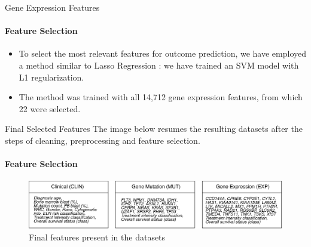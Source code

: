 
    
    


\begin{frame}{Gene Expression Features}
\framesubtitle{Feature Selection}

\begin{itemize}
    \item To select the most relevant features for outcome prediction, we have employed a method similar to Lasso Regression \cite{Tibshirani-1996}: we have trained an SVM model with L1 regularization.
    \item The method was trained with all 14,712 gene expression features, from which 22 were selected.
    
    
\end{itemize}
    
\end{frame}


\begin{frame}{Final Selected Features}
The image below resumes the resulting datasets after the steps of cleaning, preprocessing and feature selection.
\framesubtitle{Feature Selection}
    \begin{figure}
        \centering
        \includegraphics[width=1\textwidth]{beamerthemesrc/figs/selected_features.png}
        \caption{Final features present in the datasets}
        \label{fig:feature_sel}
    \end{figure}
\end{frame}



